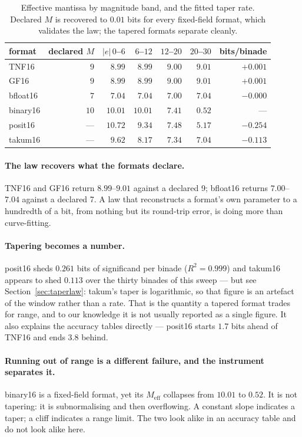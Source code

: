 \documentclass[11pt]{article}
\theoremstyle{definition}
\begin{document}
\begin{table}[t]\centering
\caption{Effective mantissa by magnitude band, and the fitted taper rate. Declared
$M$ is recovered to $0.01$ bits for every fixed-field format, which validates the
law; the tapered formats separate cleanly.}
\label{tab:meff}
\begin{tabular}{lrrrrrr}
\toprule
format & declared $M$ & $|e|\,0$--$6$ & $6$--$12$ & $12$--$20$ & $20$--$30$ & bits/binade \\
\midrule
TNF16   & $9$  & $8.99$  & $8.99$ & $9.00$ & $9.01$ & $+0.001$ \\
GF16     & $9$  & $8.99$  & $8.99$ & $9.00$ & $9.01$ & $+0.001$ \\
bfloat16 & $7$  & $7.04$  & $7.04$ & $7.00$ & $7.04$ & $-0.000$ \\
binary16 & $10$ & $10.01$ & $10.01$ & $7.41$ & $0.52$ & --- \\
posit16  & ---  & $10.72$ & $9.34$ & $7.48$ & $5.17$ & $\mathbf{-0.254}$ \\
takum16  & ---  & $9.62$  & $8.17$ & $7.34$ & $7.04$ & $\mathbf{-0.113}$ \\
\bottomrule
\end{tabular}
\end{table}

\paragraph{The law recovers what the formats declare.} TNF16 and GF16 return
$8.99$--$9.01$ against a declared 9; bfloat16 returns $7.00$--$7.04$ against a
declared 7. A law that reconstructs a format's own parameter to a hundredth of a
bit, from nothing but its round-trip error, is doing more than curve-fitting.

\paragraph{Tapering becomes a number.} posit16 sheds $0.261$ bits of significand
per binade ($R^2 = 0.999$) and takum16 appears to shed $0.113$ over the thirty
binades of this sweep --- but see Section~\ref{sec:taperlaw}: takum's taper is
logarithmic, so that figure is an artefact of the window rather than a rate. That is the
quantity a tapered format trades for range, and to our knowledge it is not usually
reported as a single figure. It also explains the accuracy tables directly ---
posit16 starts $1.7$ bits ahead of TNF16 and ends $3.8$ behind.

\paragraph{Running out of range is a different failure, and the instrument
separates it.} binary16 is a fixed-field format, yet its $M_{\mathrm{eff}}$
collapses from $10.01$ to $0.52$. It is not tapering: it is subnormalising and
then overflowing. A constant slope indicates a taper; a cliff indicates a range
limit. The two look alike in an accuracy table and do not look alike here.
\end{document}
